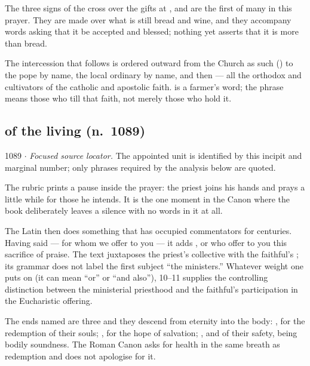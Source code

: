 The three signs of the cross over the gifts at , 
and  are the first of many in this prayer. They are made
over what is still bread and wine, and they accompany words asking that it be
accepted and blessed; nothing yet asserts that it is more than bread.

The intercession that follows is ordered outward from the Church as such
() to the pope by name, the local
ordinary by name, and then  --- all the orthodox and cultivators of the
catholic and apostolic faith.  is a farmer's word; the phrase
means those who till that faith, not merely those who hold it.

\subsection*{ of the living (n.~1089)}

\begin{appointed}{1089 $\cdot$ }
\textit{Focused source locator.} The appointed unit is identified by this incipit and marginal number; only phrases required by the analysis below are quoted.
\end{appointed}

The rubric prints a pause inside the prayer: the priest joins his hands and
prays a little while for those he intends. It is the one moment in the Canon
where the book deliberately leaves a silence with no words in it at all.

The Latin then does something that has occupied commentators for centuries.
Having said  --- for whom we offer to you
--- it adds , or who
offer to you this sacrifice of praise. The text juxtaposes the priest's
collective  with the faithful's ; its
grammar does not label the first subject ``the ministers.'' Whatever weight one
puts on  (it can mean ``or'' or ``and also''),  10--11 supplies the controlling distinction between the ministerial
priesthood and the faithful's participation in the Eucharistic offering.

The ends named are three and they descend from eternity into the body:
, for the redemption of their souls;
, for the hope of salvation; , and of their safety,  being bodily
soundness. The Roman Canon asks for health in the same breath as redemption and
does not apologise for it.


